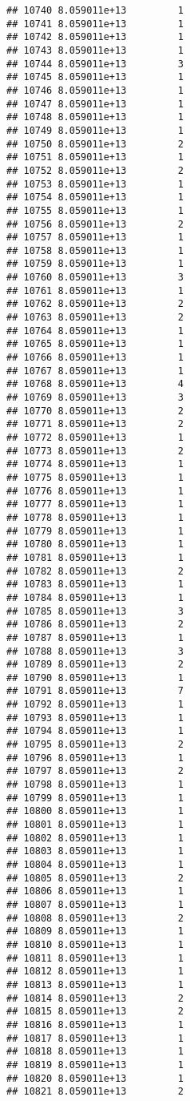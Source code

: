 \documentclass[
]{article}
\begin{document}
\begin{verbatim}
## 10740 8.059011e+13         1
## 10741 8.059011e+13         1
## 10742 8.059011e+13         1
## 10743 8.059011e+13         1
## 10744 8.059011e+13         3
## 10745 8.059011e+13         1
## 10746 8.059011e+13         1
## 10747 8.059011e+13         1
## 10748 8.059011e+13         1
## 10749 8.059011e+13         1
## 10750 8.059011e+13         2
## 10751 8.059011e+13         1
## 10752 8.059011e+13         2
## 10753 8.059011e+13         1
## 10754 8.059011e+13         1
## 10755 8.059011e+13         1
## 10756 8.059011e+13         2
## 10757 8.059011e+13         1
## 10758 8.059011e+13         1
## 10759 8.059011e+13         1
## 10760 8.059011e+13         3
## 10761 8.059011e+13         1
## 10762 8.059011e+13         2
## 10763 8.059011e+13         2
## 10764 8.059011e+13         1
## 10765 8.059011e+13         1
## 10766 8.059011e+13         1
## 10767 8.059011e+13         1
## 10768 8.059011e+13         4
## 10769 8.059011e+13         3
## 10770 8.059011e+13         2
## 10771 8.059011e+13         2
## 10772 8.059011e+13         1
## 10773 8.059011e+13         2
## 10774 8.059011e+13         1
## 10775 8.059011e+13         1
## 10776 8.059011e+13         1
## 10777 8.059011e+13         1
## 10778 8.059011e+13         1
## 10779 8.059011e+13         1
## 10780 8.059011e+13         1
## 10781 8.059011e+13         1
## 10782 8.059011e+13         2
## 10783 8.059011e+13         1
## 10784 8.059011e+13         1
## 10785 8.059011e+13         3
## 10786 8.059011e+13         2
## 10787 8.059011e+13         1
## 10788 8.059011e+13         3
## 10789 8.059011e+13         2
## 10790 8.059011e+13         1
## 10791 8.059011e+13         7
## 10792 8.059011e+13         1
## 10793 8.059011e+13         1
## 10794 8.059011e+13         1
## 10795 8.059011e+13         2
## 10796 8.059011e+13         1
## 10797 8.059011e+13         2
## 10798 8.059011e+13         1
## 10799 8.059011e+13         1
## 10800 8.059011e+13         1
## 10801 8.059011e+13         1
## 10802 8.059011e+13         1
## 10803 8.059011e+13         1
## 10804 8.059011e+13         1
## 10805 8.059011e+13         2
## 10806 8.059011e+13         1
## 10807 8.059011e+13         1
## 10808 8.059011e+13         2
## 10809 8.059011e+13         1
## 10810 8.059011e+13         1
## 10811 8.059011e+13         1
## 10812 8.059011e+13         1
## 10813 8.059011e+13         1
## 10814 8.059011e+13         2
## 10815 8.059011e+13         2
## 10816 8.059011e+13         1
## 10817 8.059011e+13         1
## 10818 8.059011e+13         1
## 10819 8.059011e+13         1
## 10820 8.059011e+13         1
## 10821 8.059011e+13         2

\end{verbatim}
\end{document}
